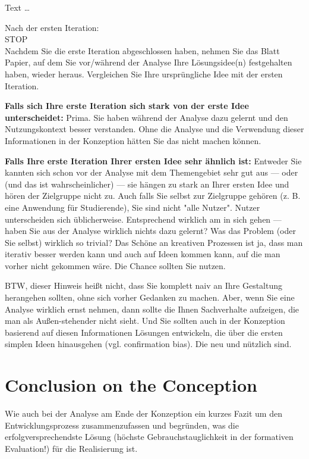 \documentclass[11pt,a4paper,english]{scrreprt}
\newenvironment{comment}
  {\par\medskip
   \begingroup\color{olive}%
   }
 {\endgroup
  \medskip}
\begin{document}
Text \dots

\newpage
\begin{comment}
\begin{center}
\huge
Nach der ersten Iteration:\\STOP\\
\normalsize
Nachdem Sie die erste Iteration abgeschlossen haben, nehmen Sie das Blatt Papier, auf dem Sie vor/während der Analyse Ihre Lösungsidee(n) festgehalten haben, wieder heraus. Vergleichen Sie Ihre ursprüngliche Idee mit der ersten Iteration.

\textbf{Falls sich Ihre erste Iteration sich stark von der erste Idee unterscheidet:} Prima. Sie haben während der Analyse dazu gelernt und den Nutzungskontext besser verstanden. Ohne die Analyse und die Verwendung dieser Informationen in der Konzeption hätten Sie das nicht machen können.

\textbf{Falls Ihre erste Iteration Ihrer ersten Idee sehr ähnlich ist:} Entweder Sie kannten sich schon vor der Analyse mit dem Themengebiet sehr gut aus — oder (und das ist wahrscheinlicher) — sie hängen zu stark an Ihrer ersten Idee und hören der Zielgruppe nicht zu. Auch falls Sie selbst zur Zielgruppe gehören (z. B. eine Anwendung für Studierende), Sie sind nicht "alle Nutzer". Nutzer unterscheiden sich üblicherweise. Entsprechend wirklich am in sich gehen — haben Sie aus der Analyse wirklich nichts dazu gelernt? Was das Problem (oder Sie selbst) wirklich so trivial? Das Schöne an kreativen Prozessen ist ja, dass man iterativ besser werden kann und auch auf Ideen kommen kann, auf die man vorher nicht gekommen wäre. Die Chance sollten Sie nutzen.

BTW, dieser Hinweis heißt nicht, dass Sie komplett naiv an Ihre Gestaltung herangehen sollten, ohne sich vorher Gedanken zu machen. Aber, wenn Sie eine Analyse wirklich ernst nehmen, dann sollte die Ihnen Sachverhalte aufzeigen, die man als Außen-stehender nicht sieht. Und Sie sollten auch in der Konzeption basierend auf diesen Informationen Lösungen entwickeln, die über die ersten simplen Ideen hinausgehen (vgl. confirmation bias). Die neu und nützlich sind.
\end{center}
\end{comment}

\section{Conclusion on the Conception}
\begin{comment}
Wie auch bei der Analyse am Ende der Konzeption ein kurzes Fazit um den Entwicklungsprozess zusammenzufassen und begründen, was die erfolgversprechendste Lösung (höchste Gebrauchstauglichkeit in der formativen Evaluation!) für die Realisierung ist.
\end{comment}
\end{document}
